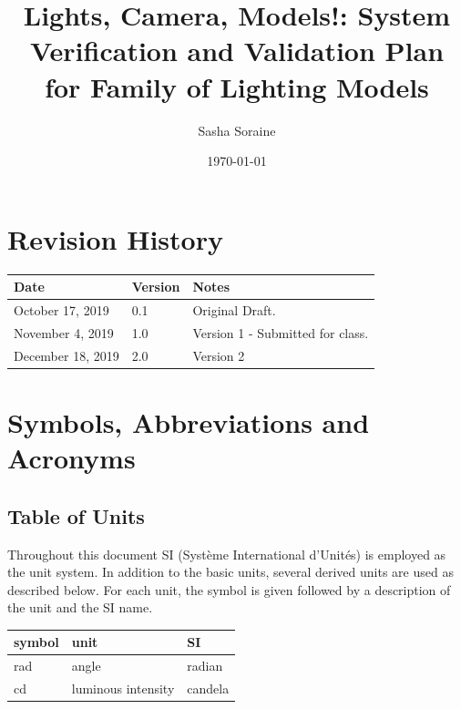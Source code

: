 \documentclass[12pt, titlepage]{article}
\begin{document}
\title{Lights, Camera, Models!: System Verification and Validation Plan for 
Family of Lighting Models} 
\author{Sasha Soraine}
\date{\today}
	
\maketitle


\section{Revision History}

\begin{tabularx}{\textwidth}{p{3cm}p{2cm}X}
\toprule {\bf Date} & {\bf Version} & {\bf Notes}\\
\midrule
October 17, 2019 & 0.1 & Original Draft.\\
November 4, 2019 & 1.0 & Version 1 - Submitted for class.\\
December 18, 2019 & 2.0 & Version 2 \\
\bottomrule
\end{tabularx}

\newpage

\tableofcontents

\listoftables

\listoffigures

\newpage

\section{Symbols, Abbreviations and Acronyms}
\subsection{Table of Units}

Throughout this document SI (Syst\`{e}me International d'Unit\'{e}s) is employed
as the unit system.  In addition to the basic units, several derived units are
used as described below.  For each unit, the symbol is given followed by a
description of the unit and the SI name.
~\newline

\renewcommand{\arraystretch}{1.2}
\noindent \begin{tabular}{l l l} 
	\toprule		
	\textbf{symbol} & \textbf{unit} & \textbf{SI}\\
	\midrule 
	\si{\radian} & angle & radian\\
	\si{cd} & luminous intensity & candela\\	
	\bottomrule
\end{tabular}
\end{document}
